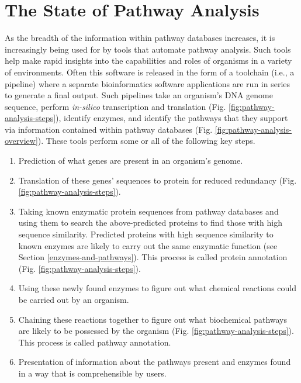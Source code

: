 \section{The State of Pathway Analysis}

As the breadth of the information within pathway databases increases, it is increasingly being used for by tools that automate pathway analysis. Such tools help make rapid insights into the capabilities and roles of organisms in a variety of environments. Often this software is released in the form of a toolchain (i.e., a pipeline) where a separate bioinformatics software applications are run in series to generate a final output. Such pipelines take an organism's DNA genome sequence, perform \textit{in-silico} transcription and translation (Fig. \ref{fig:pathway-analysis-steps}), identify enzymes, and identify the pathways that they support via information contained within pathway databases (Fig. \ref{fig:pathway-analysis-overview}). These tools perform some or all of the following key steps.

\begin{enumerate}
\item Prediction of what genes are present in an organism's genome.
\item Translation of these genes' sequences to protein for reduced redundancy (Fig. \ref{fig:pathway-analysis-steps}).
\item Taking known enzymatic protein sequences from pathway databases and using them to search the above-predicted proteins to find those with high sequence similarity. Predicted proteins with high sequence similarity to known enzymes are likely to carry out the same enzymatic function (see Section \ref{enzymes-and-pathways}). This process is called protein annotation (Fig. \ref{fig:pathway-analysis-steps}).
\item Using these newly found enzymes to figure out what chemical reactions could be carried out by an organism.
\item Chaining these reactions together to figure out what biochemical pathways are likely to be possessed by the organism (Fig. \ref{fig:pathway-analysis-steps}). This process is called pathway annotation.
\item Presentation of information about the pathways present and enzymes found in a way that is comprehensible by users.
\end{enumerate}

